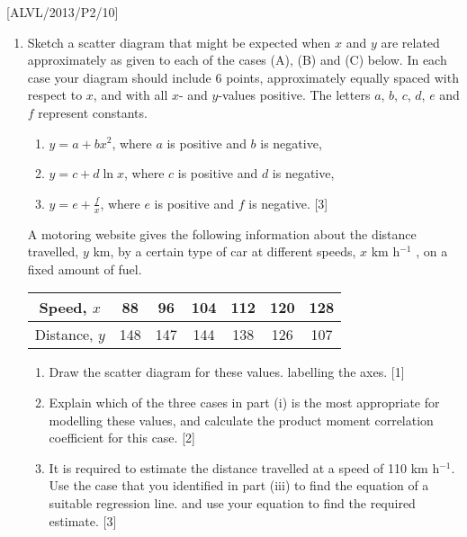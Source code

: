 \item {[}ALVL/2013/P2/10{]}
\begin{enumerate}
\item Sketch a scatter diagram that might be expected when $x$ and $y$
are related approximately as given to each of the cases (A), (B) and
(C) below. In each case your diagram should include 6 points, approximately
equally spaced with respect to $x$, and with all $x$- and $y$-values
positive. The letters $a$, $b$, $c$, $d$, $e$ and $f$ represent
constants. 
\begin{enumerate}
\item $y=a+bx^{2}$, where $a$ is positive and $b$ is negative, 
\item $y=c+d\ln x$, where $c$ is positive and $d$ is negative,
\item $y=e+\frac{f}{x}$, where $e$ is positive and $f$ is negative. \hfill{}{[}3{]}
\end{enumerate}
A motoring website gives the following information about the distance
travelled, $y$ km, by a certain type of car at different speeds,
$x$ km h$^{-1}$ , on a fixed amount of fuel. 
\begin{center}
\begin{tabular}{|c|c|c|c|c|c|c|}
\hline 
Speed, $x$ & 88 & 96 & 104 & 112 & 120 & 128\tabularnewline
\hline 
Distance, $y$ & 148 & 147 & 144 & 138 & 126 & 107\tabularnewline
\hline 
\end{tabular}
\par\end{center}
\begin{enumerate}
\item Draw the scatter diagram for these values. labelling the axes. \hfill{}{[}1{]}
\item Explain which of the three cases in part (i) is the most appropriate
for modelling these values, and calculate the product moment correlation
coefficient for this case. \hfill{}{[}2{]}
\item It is required to estimate the distance travelled at a speed of 110
km h$^{-1}$. Use the case that you identified in part (iii) to find
the equation of a suitable regression line. and use your equation
to find the required estimate. \hfill{} {[}3{]}
\end{enumerate}
\end{enumerate}
